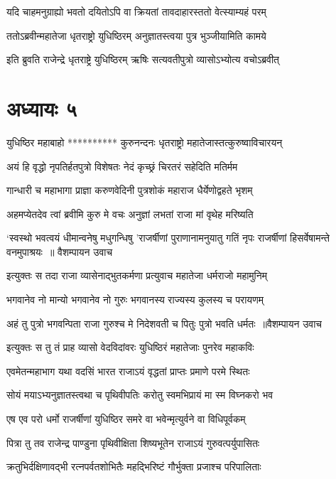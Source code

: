 \twolineshloka
{यदि चाहमनुग्राह्यो भवतो दयितोऽपि वा}
{क्रियतां तावदाहारस्ततो वेत्स्याम्यहं परम्}


\twolineshloka
{ततोऽब्रवीन्महातेजा धृतराष्ट्रो युधिष्ठिरम्}
{अनुज्ञातस्त्वया पुत्र भुञ्जीयामिति कामये}


\twolineshloka
{इति ब्रुवति राजेन्द्रे धृतराष्ट्रे युधिष्ठिरम्}
{ऋषिः सत्यवतीपुत्रो व्यासोऽभ्योत्य वचोऽब्रवीत्}


\chapter{अध्यायः ५}
\twolineshloka
{युधिष्ठिर महाबाहो ********** कुरुनन्दनः}
{धृतराष्ट्रो महातेजास्तत्कुरुष्वाविचारयन्}


\twolineshloka
{अयं हि वृद्धो नृपतिर्हतपुत्रो विशेषतः}
{नेदं कृच्छ्रं चिरतरं सहेदिति मतिर्मम}


\twolineshloka
{गान्धारी च महाभागा प्राज्ञा करुणवेदिनी}
{पुत्रशोकं महाराज धैर्येणोद्वहते भृशम्}


\twolineshloka
{अहमप्येतदेव त्वां ब्रवीमि कुरु मे वचः}
{अनुज्ञां लभतां राजा मां वृथेह मरिष्यति}


\fourlineindentedshloka
{`स्वस्थो भवत्वयं धीमान्वनेषु मधुगन्धिषु}
{'राजर्षीणां पुराणानामनुयातु गतिं नृपः}
{राजर्षीणां हिसर्वेषामन्ते वनमुपाश्रयः ॥ वैशम्पायन उवाच}
{}


\twolineshloka
{इत्युक्तः स तदा राजा व्यासेनाद्भुतकर्मणा}
{प्रत्युवाच महातेजा धर्मराजो महामुनिम्}


\twolineshloka
{भगवानेव नो मान्यो भगवानेव नो गुरुः}
{भगवानस्य राज्यस्य कुलस्य च परायणम्}


\threelineshloka
{अहं तु पुत्रो भगवन्पिता राजा गुरुश्च मे}
{निदेशवती च पितुः पुत्रो भवति धर्मतः ॥वैशम्पायन उवाच}
{}


\twolineshloka
{इत्युक्तः स तु तं प्राह व्यासो वेदविदांवरः}
{युधिष्ठिरं महातेजाः पुनरेव महाकविः}


\twolineshloka
{एवमेतन्महाभाग यथा वदसिं भारत}
{राजाऽयं वृद्धतां प्राप्तः प्रमाणे परमे स्थितः}


\twolineshloka
{सोयं मयाऽभ्यनुज्ञातस्त्वथा च पृथिवीपतिः}
{करोतु स्वमभिप्रायं मा स्म विघ्नकरो भव}


\twolineshloka
{एष एव परो धर्मो राजर्षीणां युधिष्ठिर}
{समरे वा भवेन्मृत्युर्वने वा विधिपूर्वकम्}


\twolineshloka
{पित्रा तु तव राजेन्द्र पाण्डुना पृथिवीक्षिता}
{शिष्यभूतेन राजाऽयं गुरुवत्पर्युपासितः}


\twolineshloka
{क्रतुभिर्दक्षिणावद्भी रत्नपर्वतशोभितैः}
{महद्भिरिष्टं गौर्भुक्ता प्रजाश्च परिपालिताः}



